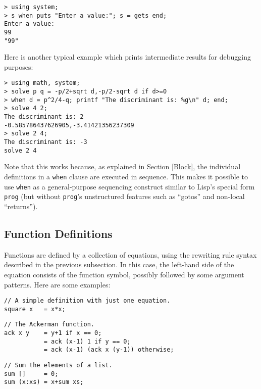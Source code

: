 \documentclass[a4paper,12pt]{article}
\begin{document}
\begin{lstlisting}
> using system;
> s when puts "Enter a value:"; s = gets end;
Enter a value:
99
"99"
\end{lstlisting}

Here is another typical example which prints intermediate results for debugging purposes:

\begin{lstlisting}
> using math, system;
> solve p q = -p/2+sqrt d,-p/2-sqrt d if d>=0
> when d = p^2/4-q; printf "The discriminant is: %g\n" d; end;
> solve 4 2;
The discriminant is: 2
-0.585786437626905,-3.41421356237309
> solve 2 4;
The discriminant is: -3
solve 2 4
\end{lstlisting}

Note that this works because, as explained in Section \ref{Block}, the individual definitions in a \lstinline{when} clause are executed in sequence. This makes it possible to use \lstinline{when} as a general-purpose sequencing construct similar to Lisp's special form \verb|prog| (but without \verb|prog|'s unstructured features such as ``gotos'' and non-local ``returns'').

\subsection{Function Definitions}
\label{Fundefs}

Functions are defined by a collection of equations, using the rewriting rule syntax described in the previous subsection. In this case, the left-hand side of the equation consists of the function symbol, possibly followed by some argument patterns. Here are some examples:

\begin{lstlisting}
// A simple definition with just one equation.
square x   = x*x;
\end{lstlisting}

\begin{lstlisting}
// The Ackerman function.
ack x y    = y+1 if x == 0;
           = ack (x-1) 1 if y == 0;
           = ack (x-1) (ack x (y-1)) otherwise;
\end{lstlisting}

\begin{lstlisting}
// Sum the elements of a list.
sum []     = 0;
sum (x:xs) = x+sum xs;
\end{lstlisting}
\end{document}
